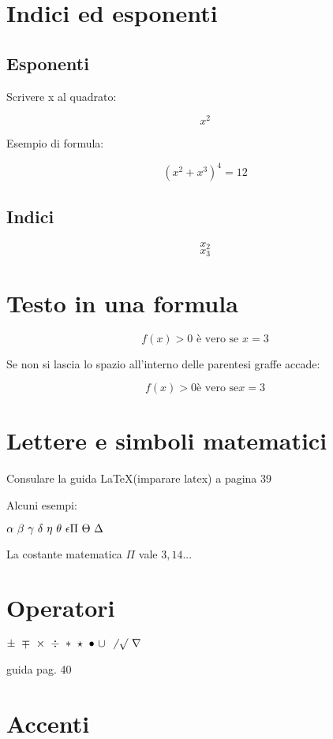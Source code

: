 \documentclass{article}
\begin{document}
\section{Indici ed esponenti}

\subsection{Esponenti}

Scrivere x al quadrato:

$$ x^2 $$

Esempio di formula:

$$ (x^2 + x^3)^4 = 12 $$

\subsection{Indici}

$$ x_2 $$
$$ x_3 $$

\section{Testo in una formula}
$$ f(x)> 0 \mbox{ è vero se } x=3 $$ %

Se non si lascia lo spazio all'interno delle parentesi graffe accade:

$$ f(x)>0 \mbox{è vero se} x=3$$

\section{Lettere e simboli matematici}

Consulare la guida \LaTeX (imparare latex) a pagina 39

Alcuni esempi:

$ \alpha\ \beta\ \gamma\ \delta\ \eta\ \theta\ \epsilon\\ \Pi\ \Theta\ \Delta\ $

La costante matematica $\Pi$ vale $3,14...$

\section{Operatori}

$ \pm\ \mp\ \times\ \div\ \ast\ \star\ \bullet\ \cup\ \not\ \surd\ \nabla $

guida pag. 40

\section{Accenti}
\end{document}
